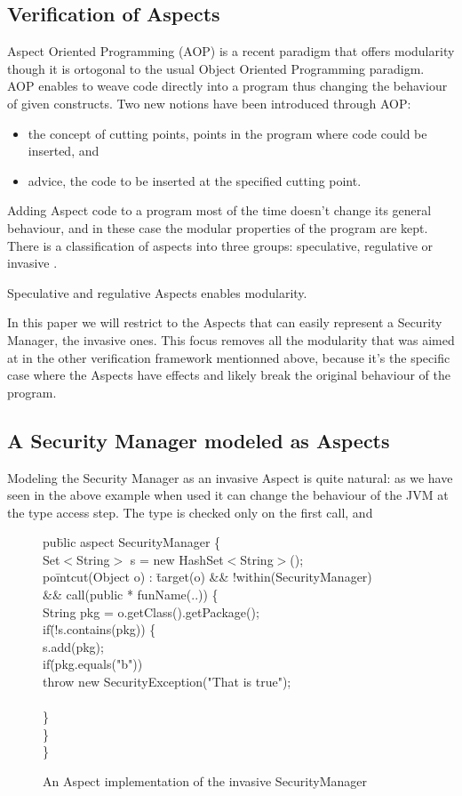 \documentclass[draft]{llncs}
\begin{document}
\subsection{Verification of Aspects}
Aspect Oriented Programming (AOP) is a recent paradigm that offers modularity though it is ortogonal to 
the usual Object Oriented Programming paradigm. AOP enables to weave code directly into a program
thus changing the behaviour of given constructs. Two new notions have been introduced through AOP:
\begin{itemize}
\item the concept of cutting points, points in the program where code could be inserted, and
\item advice, the code to be inserted at the specified cutting point.
\end{itemize}
Adding Aspect code to a program most of the time doesn't change its general behaviour, and in these case
the modular properties of the program are kept.
There is a classification of aspects into three groups: speculative, regulative or invasive .

Speculative and regulative Aspects enables modularity. 


In this paper we will restrict to the Aspects that can easily represent a Security Manager, the invasive
ones. This focus removes all the modularity that was aimed at in the other verification framework
mentionned above,
because it's the specific case where the Aspects have effects and likely break the original behaviour of
the program.

\subsection{A Security Manager modeled as Aspects}
Modeling the Security Manager as an invasive Aspect is quite natural: as we have seen in the above example 
when used it can change the behaviour of the JVM at the type access step. The type is checked only on the
first call, and
%
\begin{figure}
\bcode
pu\=blic aspect SecurityManager \{\+\\

Set$<$String$>$ s = new HashSet$<$String$>$();\\
po\=intcut(Object o) : \=target(o) \&\& !within(SecurityManager)\+ \\
           \>\&\& call(public * funName(..)) \{\\
    String pkg = o.getClass().getPackage();\\
    if\=(!s.contains(pkg)) \{\+\\     
       s.add(pkg);\\
       if\=(pkg.equals("b"))\\
           \>throw new SecurityException("That is true");\\\-\\ 
    \}\-\\
\}\-\\
\}
  
\ecode
\caption{An Aspect implementation of the invasive SecurityManager}
\end{figure}
\end{document}
